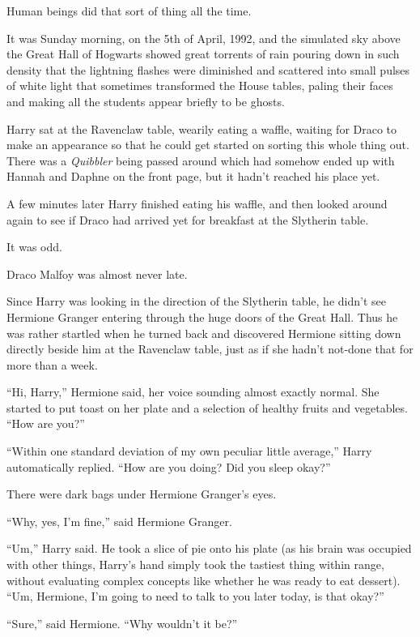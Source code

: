 Human beings did that sort of thing all the time.

\later

It was Sunday morning, on the 5th of April, 1992, and the simulated sky above the Great Hall of Hogwarts showed great torrents of rain pouring down in such density that the lightning flashes were diminished and scattered into small pulses of white light that sometimes transformed the House tables, paling their faces and making all the students appear briefly to be ghosts.

Harry sat at the Ravenclaw table, wearily eating a waffle, waiting for Draco to make an appearance so that he could get started on sorting this whole thing out. There was a \emph{Quibbler} being passed around which had somehow ended up with Hannah and Daphne on the front page, but it hadn’t reached his place yet.

A few minutes later Harry finished eating his waffle, and then looked around again to see if Draco had arrived yet for breakfast at the Slytherin table.

It was odd.

Draco Malfoy was almost never late.

Since Harry was looking in the direction of the Slytherin table, he didn’t see Hermione Granger entering through the huge doors of the Great Hall. Thus he was rather startled when he turned back and discovered Hermione sitting down directly beside him at the Ravenclaw table, just as if she hadn’t not-done that for more than a week.

“Hi, Harry,” Hermione said, her voice sounding almost exactly normal. She started to put toast on her plate and a selection of healthy fruits and vegetables. “How are you?”

“Within one standard deviation of my own peculiar little average,” Harry automatically replied. “How are you doing? Did you sleep okay?”

There were dark bags under Hermione Granger’s eyes.

“Why, yes, I’m fine,” said Hermione Granger.

“Um,” Harry said. He took a slice of pie onto his plate (as his brain was occupied with other things, Harry’s hand simply took the tastiest thing within range, without evaluating complex concepts like whether he was ready to eat dessert). “Um, Hermione, I’m going to need to talk to you later today, is that okay?”

“Sure,” said Hermione. “Why wouldn’t it be?”

